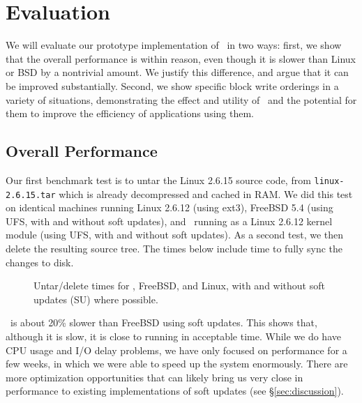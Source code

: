 \section {Evaluation}
\label{sec:evaluation}

We will evaluate our prototype implementation of \Kudos\ in two ways: first, we
show that the overall performance is within reason, even though it is slower
than Linux or BSD by a nontrivial amount. We justify this difference, and argue
that it can be improved substantially. Second, we show specific block write
orderings in a variety of situations, demonstrating the effect and utility of
\opgroups\ and the potential for them to improve the efficiency of applications
using them.

\subsection {Overall Performance}

Our first benchmark test is to untar the Linux 2.6.15 source code, from
\texttt{linux-2.6.15.tar} which is already decompressed and cached in RAM. We
did this test on identical machines running Linux 2.6.12 (using ext3), FreeBSD
5.4 (using UFS, with and without soft updates), and \Kudos\ running as a Linux
2.6.12 kernel module (using UFS, with and without soft updates). As a second
test, we then delete the resulting source tree. The times below include time to
fully sync the changes to disk.

\begin{figure}[htb]
\caption{\label{fig:macro} Untar/delete times for \Kudos, FreeBSD, and Linux,
with and without soft updates (SU) where possible.}
\end{figure}

\Kudos\ is about 20\% slower than FreeBSD using soft updates. This shows
that, although it is slow, it is close to running in acceptable time. While
we do have CPU usage and I/O delay problems, we have only focused on
performance for a few weeks, in which we were able to speed up the system
enormously.  There are more optimization opportunities that can likely
bring us very close in performance to existing implementations of soft
updates (see \S\ref{sec:discussion}).

